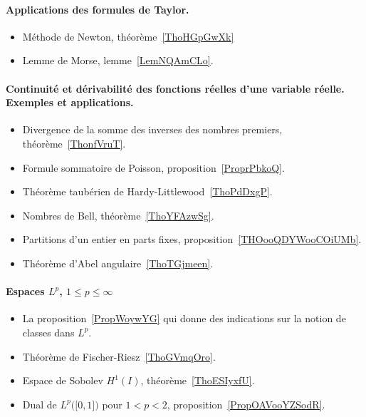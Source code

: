 \paragraph{Applications des formules de Taylor.}
\begin{itemize}
	\item Méthode de Newton, théorème~\ref{ThoHGpGwXk}
	\item Lemme de Morse, lemme~\ref{LemNQAmCLo}.
\end{itemize}
\paragraph{Continuité et dérivabilité des fonctions réelles d'une variable réelle. Exemples et applications.}
\begin{itemize}
	\item Divergence de la somme des inverses des nombres premiers, théorème~\ref{ThonfVruT}.
	\item Formule sommatoire de Poisson, proposition~\ref{ProprPbkoQ}.
	\item Théorème taubérien de Hardy-Littlewood~\ref{ThoPdDxgP}.
	\item Nombres de Bell, théorème~\ref{ThoYFAzwSg}.
	\item Partitions d'un entier en parts fixes, proposition~\ref{THOooQDYWooCOiUMb}.
	\item Théorème d'Abel angulaire~\ref{ThoTGjmeen}.
\end{itemize}
\paragraph{Espaces \( L^p\), \( 1\leq p\leq\infty\)}
\begin{itemize}
	\item La proposition~\ref{PropWoywYG} qui donne des indications sur la notion de classes dans \( L^p\).
	\item Théorème de Fischer-Riesz~\ref{ThoGVmqOro}.
	\item Espace de Sobolev \( H^1(I)\), théorème~\ref{ThoESIyxfU}.
	\item Dual de \( L^p\big( \mathopen[ 0 , 1 \mathclose] \big)\) pour \( 1<p<2\), proposition~\ref{PropOAVooYZSodR}.
\end{itemize}
